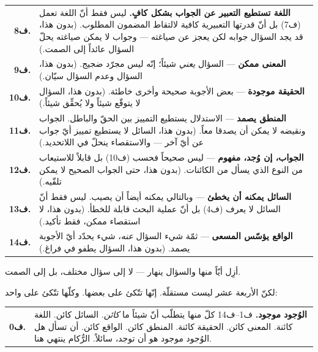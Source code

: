 \documentclass[10pt, openany, oneside]{book}
\renewcommand{\footnotesize}{\fontsize{8.5}{11}\selectfont}
\begin{document}
{\footnotesize
\noindent\begin{tabular}{r p{}}
\textbf{ف8.} & \textbf{اللغة تستطيع التعبير عن الجواب بشكل كافٍ.} ليس فقط أنّ اللغة تعمل (ف7) بل أنّ قدرتها التعبيرية كافية لالتقاط المضمون المطلوب. (بدون هذا، قد يجد السؤال جوابه لكن يعجز عن صياغته --- وجواب لا يمكن صياغته يحلّ السؤال عائداً إلى الصمت.) \\[0.3em]
\textbf{ف9.} & \textbf{المعنى ممكن} --- السؤال \textit{يعني} شيئاً؛ إنّه ليس مجرّد ضجيج. (بدون هذا، السؤال وعدم السؤال سيّان.) \\[0.3em]
\textbf{ف10.} & \textbf{الحقيقة موجودة} --- بعض الأجوبة صحيحة وأخرى خاطئة. (بدون هذا، السؤال لا يتوقّع شيئاً ولا يُحقِّق شيئاً.) \\[0.3em]
\textbf{ف11.} & \textbf{المنطق يصمد} --- الاستدلال يستطيع التمييز بين الحقّ والباطل. الجواب ونقيضه لا يمكن أن يصدقا معاً. (بدون هذا، السائل لا يستطيع تمييز أيّ جواب عن أيّ آخر --- والاستقصاء ينحلّ في اللاتحديد.) \\[0.3em]
\textbf{ف12.} & \textbf{الجواب، إن وُجد، مفهوم} --- ليس صحيحاً فحسب (ف10) بل قابلاً للاستيعاب من النوع الذي يسأل من الكائنات. (بدون هذا، حتى الجواب الصحيح لا يمكن تلقّيه.) \\[0.3em]
\textbf{ف13.} & \textbf{السائل يمكنه أن يخطئ} --- وبالتالي يمكنه أيضاً أن يصيب. ليس فقط أنّ السائل لا يعرف (ف4) بل أنّ عملية البحث قابلة للخطأ. (بدون هذا، لا استقصاء ممكن، فقط تأكيد.) \\[0.3em]
\textbf{ف14.} & \textbf{الواقع يؤسّس المسعى} --- ثمّة شيء السؤال \textit{عنه}، شيء يحدّد أيّ الأجوبة يصمد. (بدون هذا، السؤال يطفو في فراغ.) \\[0.3em]
\end{tabular}
}

\vspace{0.8em}

\noindent أزِل أيّاً منها والسؤال ينهار --- لا إلى سؤال مختلف، بل إلى الصمت.

لكنّ الأربعة عشر ليست مستقلّة. إنّها تتّكئ على بعضها. وكلّها تتّكئ على واحد:

\vspace{0.5em}

\noindent\begin{tabular}{r p{}}
\textbf{ف0.} & \textbf{الوُجود موجود.} ف1--ف14 كلّ منها يتطلّب أنّ شيئاً ما \textit{كائن}. السائل كائن. اللغة كائنة. المعنى كائن. الحقيقة كائنة. المنطق كائن. الواقع كائن. أن تسأل هل الوُجود موجود هو أن توجد، سائلاً. الرُّكام ينتهي هنا. \\[0.3em]
\end{tabular}
\end{document}
